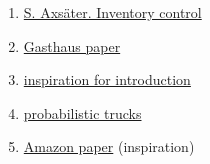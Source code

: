 \documentclass[a4paper,12pt]{article}
\theoremstyle{definition}
\begin{document}
	\begin{enumerate}
		\item \href{https://www.academia.edu/27965536/Inventorycontroltextbook_140429044831_phpapp02_1_}{S. Axsäter. Inventory control}
		\item \href{https://proceedings.mlr.press/v151/kan22a/kan22a.pdf}{Gasthaus paper}
		\item \href{https://arxiv.org/pdf/2012.02392}{inspiration for introduction}
		\item \href{https://arxiv.org/pdf/2310.17168}{probabilistic trucks}
		\item \href{https://arxiv.org/pdf/2310.16096}{Amazon paper} (inspiration)
	\end{enumerate}
	
	\newpage
	\begin{appendices}
		
		
		
	\end{appendices}
	
	
	
	
	
	
\end{document}
